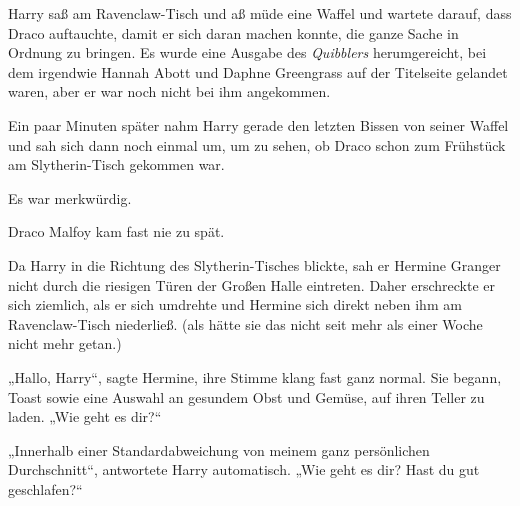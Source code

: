 Harry saß am Ravenclaw-Tisch und aß müde eine Waffel und wartete darauf, dass Draco auftauchte, damit er sich daran machen konnte, die ganze Sache in Ordnung zu bringen. Es wurde eine Ausgabe des \emph{Quibblers} herumgereicht, bei dem irgendwie Hannah Abott und Daphne Greengrass auf der Titelseite gelandet waren, aber er war noch nicht bei ihm angekommen.

Ein paar Minuten später nahm Harry gerade den letzten Bissen von seiner Waffel und sah sich dann noch einmal um, um zu sehen, ob Draco schon zum Frühstück am Slytherin-Tisch gekommen war.

Es war merkwürdig.

Draco Malfoy kam fast nie zu spät.

Da Harry in die Richtung des Slytherin-Tisches blickte, sah er Hermine Granger nicht durch die riesigen Türen der Großen Halle eintreten. Daher erschreckte er sich ziemlich, als er sich umdrehte und Hermine sich direkt neben ihm am Ravenclaw-Tisch niederließ. (als hätte sie das nicht seit mehr als einer Woche nicht mehr getan.)

„Hallo, Harry“, sagte Hermine, ihre Stimme klang fast ganz normal. Sie begann, Toast sowie eine Auswahl an gesundem Obst und Gemüse, auf ihren Teller zu laden. „Wie geht es dir?“

„Innerhalb einer Standardabweichung von meinem ganz persönlichen Durchschnitt“, antwortete Harry automatisch. „Wie geht es dir? Hast du gut geschlafen?“


